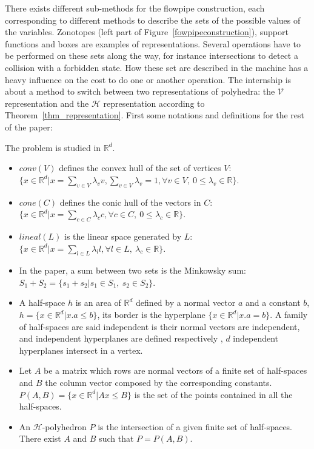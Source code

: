There exists different sub-methods for the flowpipe construction, each corresponding to different methods to describe the sets of the possible values of the variables. Zonotopes (left part of Figure~\ref{fowpipeconstruction}), support functions and boxes are examples of representations. Several operations have to be performed on these sets along the way, for instance intersections to detect a collision with a forbidden state. How these set are described in the machine has a heavy influence on the cost to do one or another operation. The internship is about a method to switch between two representations of polyhedra: the $\mathcal{V}$ representation and the $\mathcal{H}$ representation according to Theorem~\ref{thm_representation}. First some notations and definitions for the rest of the paper:
 
\begin{definition}
	The problem is studied in $\mathbb{R}^d$.
	\begin{itemize}
	\item $conv(V)$ defines the convex hull of the set of vertices $V$: $\{ x\in\mathbb{R}^d| x=\sum_{v\in V} \lambda_v v, \sum_{v\in V} \lambda_v =1, \forall v \in V, \ 0\leq \lambda_v \in \mathbb{R} \}$.
	\item $cone(C)$ defines the conic hull of the vectors in $C$: $\{ x\in\mathbb{R}^d| x=\sum_{c\in C} \lambda_c c, \forall c \in C,\ 0\leq \lambda_c \in \mathbb{R} \}$.
	\item $lineal(L)$ is the linear space generated by $L$: $\{ x\in\mathbb{R}^d| x=\sum_{l\in L} \lambda_l l, \forall l \in L,\ \lambda_c \in \mathbb{R} \}$. 
	\item In the paper, a sum between two sets is the Minkowsky sum: $S_1+S_2=\{s_1+s_2|s_1\in S_1,\ s_2 \in S_2 \}$.
	\item A half-space $h$ is an area of $\mathbb{R}^d$ defined by a normal vector $a$ and a constant $b$, $h=\{x\in\mathbb{R}^d|x.a\leq b\}$, its border is the hyperplane $\{x\in\mathbb{R}^d|x.a = b\}$. A family of half-spaces are said independent is their normal vectors are independent, and independent hyperplanes are defined respectively , $d$ independent hyperplanes intersect in a vertex.
	\item Let $A$ be a matrix which rows are normal vectors of a finite set of half-spaces and $B$ the column vector composed by the corresponding constants. $P(A,B)=\{x\in\mathbb{R}^d|Ax\leq B\}$ is the set of the points contained in all the half-spaces.
	\item An $\mathcal{H}$-polyhedron $P$ is the intersection of a given finite set of half-spaces. There exist $A$ and $B$ such that $P=P(A,B)$.

\end{itemize}
\end{definition}
